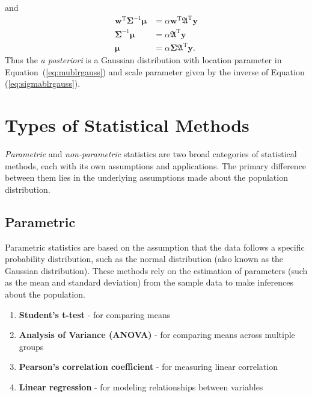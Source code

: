 and
\begin{align}
    \mathbf{w}^{\text{T}}\boldsymbol{\Sigma}^{-1}\boldsymbol{\mu}&=\alpha\mathbf{w}^{\text{T}}\boldsymbol{\mathfrak{A}}^{\text{T}}\mathbf{y}\\
    \boldsymbol{\Sigma}^{-1}\boldsymbol{\mu}&=\alpha\boldsymbol{\mathfrak{A}}^{\text{T}}\mathbf{y}\\
    \boldsymbol{\mu}&=\alpha\boldsymbol{\Sigma}\boldsymbol{\mathfrak{A}}^{\text{T}}\mathbf{y}.\label{eq:mublrgauss}
\end{align}
Thus the \textit{a posteriori} is a Gaussian distribution with location parameter in \mbox{Equation (\ref{eq:mublrgauss})} and scale parameter given by the inverse of Equation (\ref{eq:sigmablrgauss}).
\section{Types of Statistical Methods}
\textit{Parametric} and \textit{non-parametric} statistics are two broad categories of statistical methods, each with its own assumptions and applications. The primary difference between them lies in the underlying assumptions made about the population distribution.
\subsection{Parametric}
Parametric statistics are based on the assumption that the data follows a specific probability distribution, such as the normal distribution (also known as the Gaussian distribution). These methods rely on the estimation of parameters (such as the mean and standard deviation) from the sample data to make inferences about the population.
\begin{enumerate}
    \item \textbf{Student's t-test} - for comparing means
    \item \textbf{Analysis of Variance (ANOVA)} - for comparing means across multiple groups
    \item \textbf{Pearson's correlation coefficient} - for measuring linear correlation
    \item \textbf{Linear regression} - for modeling relationships between variables
\end{enumerate}
